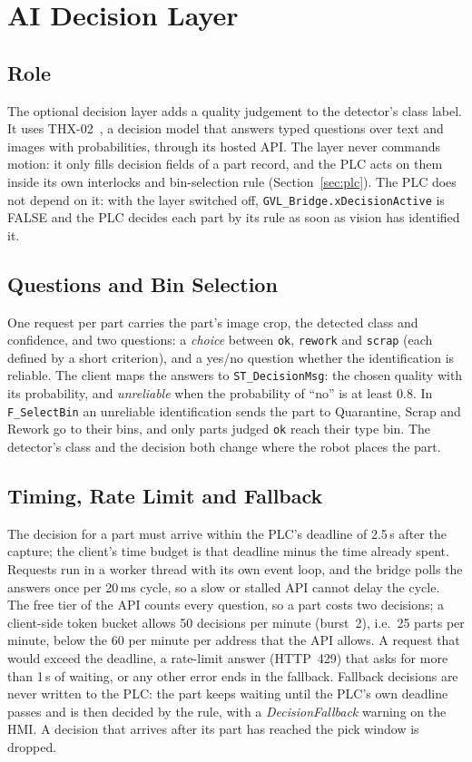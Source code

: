 \section{AI Decision Layer}\label{sec:decision}

\subsection{Role}

The optional decision layer adds a quality judgement to the detector's class label. It uses
THX-02~\cite{HALX2026thx02}, a decision model that answers typed questions over text and images
with probabilities, through its hosted API. The layer never commands motion: it only fills
decision fields of a part record, and the PLC acts on them inside its own interlocks and
bin-selection rule (Section~\ref{sec:plc}). The PLC does not depend on it: with
the layer switched off, \texttt{GVL\_Bridge.xDecisionActive} is FALSE and the PLC decides each
part by its rule as soon as vision has identified it.

\subsection{Questions and Bin Selection}

One request per part carries the part's image crop, the detected class and confidence, and two
questions: a \emph{choice} between \texttt{ok}, \texttt{rework} and \texttt{scrap} (each defined by a
short criterion), and a yes/no question whether the identification is reliable. The client maps
the answers to \texttt{ST\_DecisionMsg}: the chosen quality with its probability, and
\emph{unreliable} when the probability of ``no'' is at least 0.8. In \texttt{F\_SelectBin} an
unreliable identification sends the part to Quarantine, Scrap and Rework go to their bins, and
only parts judged \texttt{ok} reach their type bin. The detector's class and the decision both
change where the robot places the part.

\subsection{Timing, Rate Limit and Fallback}

The decision for a part must arrive within the PLC's deadline of 2.5\,s after the capture; the
client's time budget is that deadline minus the time already spent. Requests run in a worker
thread with its own event loop, and the bridge polls the answers once per 20\,ms cycle, so a slow
or stalled API cannot delay the cycle. The free tier of the API counts every question, so a part
costs two decisions; a client-side token bucket allows 50 decisions per minute (burst~2), i.e.\
25 parts per minute, below the 60 per minute per address that the API allows. A request that
would exceed the deadline, a rate-limit answer (HTTP~429) that asks for more than 1\,s of waiting,
or any other error ends in the fallback. Fallback decisions are never written to the PLC: the
part keeps waiting until the PLC's own deadline passes and is then decided by the rule, with a
\emph{DecisionFallback} warning on the HMI. A decision that arrives after its part has reached
the pick window is dropped.

